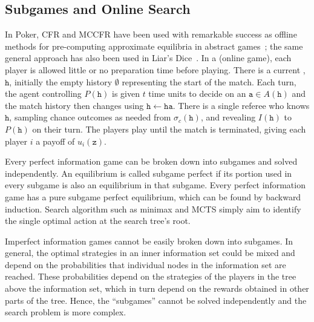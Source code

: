 \documentclass[letterpaper]{article}
\newcommand{\tta}{\mathtt{a}}
\newcommand{\tth}{\mathtt{h}}
\newcommand{\ttz}{\mathtt{z}}
\newcommand{\defword}[1]{\textbf{\boldmath{#1}}}
\begin{document}
\subsection{Subgames and Online Search}


In Poker, CFR and MCCFR have been used with remarkable success as offline methods 
for pre-computing approximate equilibria in abstract games~\cite{CFR,Johanson12CFRBR}; the same general 
approach has also been used in Liar's Dice~\cite{Lanctot12IR,Neller11}. 
In a \defword{match} (online game), each player is allowed little or no preparation time before playing.
There is a current \defword{match history}, $\tth$, initially the empty history $\emptyset$ representing the start of the match. Each turn, 
the agent controlling $P(\tth)$ is given $t$ time units to decide on an \defword{match action} $\tta \in A(\tth)$ and the 
match history then changes using $\tth \leftarrow \tth \tta$. There is a single referee who knows $\tth$, sampling chance outcomes 
as needed from $\sigma_c(\tth)$, and revealing $I(\tth)$ to $P(\tth)$ on their turn. The players play until the match is terminated, 
giving each player $i$ a payoff of $u_i(\ttz)$.

Every perfect information game can be broken down into subgames and solved independently. 
An equilibrium is called subgame perfect if its portion used in every subgame is also an equilibrium in that subgame. 
Every perfect information game has a pure subgame perfect equilibrium, which can be found by backward induction. 
Search algorithm such as minimax and MCTS simply aim to identify the single optimal action at the search tree's root. 

Imperfect information games cannot be easily broken down into subgames. In general, the optimal strategies in an inner information set 
could be mixed and depend on the probabilities that individual nodes in the information set are reached. These probabilities depend on the 
strategies of the players in the tree above the information set, which in turn depend on the rewards obtained in other parts of the tree. 
Hence, the ``subgames'' cannot be solved independently and the search problem is more complex. 
\end{document}
